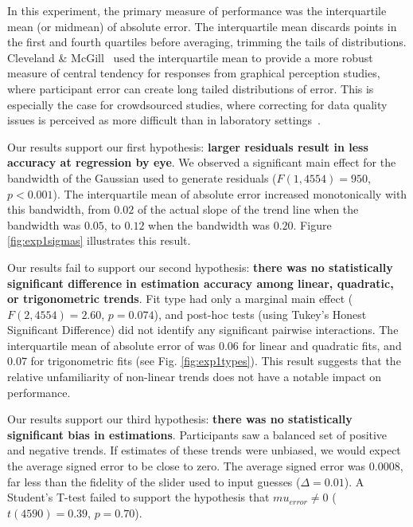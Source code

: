\documentclass{sigchi}
\begin{document}
In this experiment, the primary measure of performance was the interquartile mean (or midmean) of absolute error. The interquartile mean discards points in the first and fourth quartiles before averaging, trimming the tails of distributions. Cleveland \& McGill~\cite{cleveland1984graphical} used the interquartile mean to provide a more robust measure of central tendency for responses from graphical perception studies, where participant error can create long tailed distributions of error. This is especially the case for crowdsourced studies, where correcting for data quality issues is perceived as more difficult than in laboratory settings~\cite{heer2010crowdsourcing}.

Our results support our first hypothesis: \textbf{larger residuals result in less accuracy at regression by eye}.  We observed a significant main effect for the bandwidth of the Gaussian used to generate residuals ($F(1,4554)=950$, $p<0.001$). The interquartile mean of absolute error increased monotonically with this bandwidth, from $0.02$ of the actual slope of the trend line when the bandwidth was $0.05$, to $0.12$ when the bandwidth was $0.20$. Figure \ref{fig:exp1sigmas} illustrates this result.

Our results fail to support our second hypothesis: \textbf{there was no statistically significant difference in estimation accuracy among linear, quadratic, or trigonometric trends}. Fit type had only a marginal main effect ($F(2,4554)=2.60$, $p=0.074$), and post-hoc tests (using Tukey's Honest Significant Difference) did not identify any significant pairwise interactions. The interquartile mean of absolute error of was $0.06$ for linear and quadratic fits, and $0.07$ for trigonometric fits (see Fig. \ref{fig:exp1types}). This result suggests that the relative unfamiliarity of non-linear trends does not have a notable impact on performance.

Our results support our third hypothesis: \textbf{there was no statistically significant bias in estimations}. Participants saw a balanced set of positive and negative trends. If estimates of these trends were unbiased, we would expect the average signed error to be close to zero. The average signed error was $0.0008$, far less than the fidelity of the slider used to input guesses ($\Delta=0.01$). A Student's T-test failed to support the hypothesis that $mu_{error}\ne0$ ($t(4590) = 0.39$, $p=0.70$).
\end{document}
